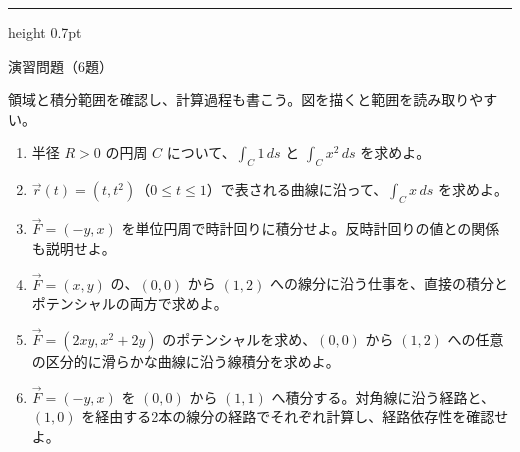 \documentclass[a4paper,10pt,pdflatex,ja=standard,jafont=ipaex-type1,
  magstyle=real,scale=1]{bxjsarticle}
\newcommand{\topic}[1]{\par\vspace{5pt}%
  {\large\sffamily\mdseries\color{accent}#1}\par\vspace{2pt}}
\newenvironment{problems}
  {\begin{enumerate}[leftmargin=2em,itemsep=3pt,topsep=3pt,parsep=0pt,
    font=\color{accent}]}
  {\end{enumerate}}
\newcommand{\problemspace}{\par\vspace{5mm}}
\newcommand{\exercises}{%
  {\color{accent}\hrule height 0.7pt}\vspace{3pt}%
  \topic{演習問題（6題）}%
  {\small 領域と積分範囲を確認し、計算過程も書こう。図を描くと範囲を読み取りやすい。}\par}
\begin{document}
\noindent\begin{minipage}[b][0.5\textheight][t]{\linewidth}
\exercises
\begin{problems}
\item 半径 $R>0$ の円周 $C$ について、$\int_C1\,ds$ と $\int_Cx^2\,ds$ を求めよ。
\problemspace

\item $\vec r(t)=(t,t^2)$（$0\le t\le1$）で表される曲線に沿って、$\int_Cx\,ds$ を求めよ。
\problemspace

\item $\vec F=(-y,x)$ を単位円周で時計回りに積分せよ。反時計回りの値との関係も説明せよ。
\problemspace

\item $\vec F=(x,y)$ の、$(0,0)$ から $(1,2)$ への線分に沿う仕事を、直接の積分とポテンシャルの両方で求めよ。
\problemspace

\item $\vec F=(2xy,x^2+2y)$ のポテンシャルを求め、$(0,0)$ から $(1,2)$ への任意の区分的に滑らかな曲線に沿う線積分を求めよ。
\problemspace

\item $\vec F=(-y,x)$ を $(0,0)$ から $(1,1)$ へ積分する。対角線に沿う経路と、$(1,0)$ を経由する2本の線分の経路でそれぞれ計算し、経路依存性を確認せよ。
\problemspace
\end{problems}
\end{minipage}
\end{document}
